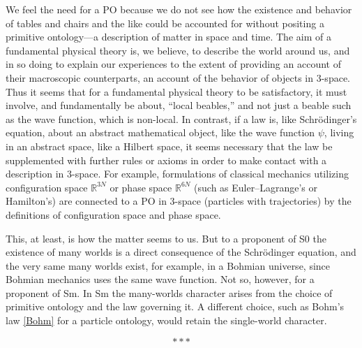 \documentclass[12pt]{article}
\newcommand{\RRR}{\mathbb{R}}
\newcommand{\z}[1]{{#1}}
\begin{document}
\z{We feel the need for a PO because}
we do not see how the existence and behavior of
tables and chairs and the like could be accounted for without positing a
primitive ontology---a description of matter in space and time.
The aim of a fundamental physical theory is, we believe, to describe the
world around us, and in so doing to explain our experiences to the extent
of providing an account of their macroscopic counterparts, an account of
the behavior of objects in $3$-space. Thus it seems that for a fundamental
physical theory to be satisfactory, it must involve, and fundamentally be
about, ``local beables,'' and not just a beable such as the wave function,
which is non-local.
In contrast, if a law is, like Schr\"odinger's equation,
about an abstract mathematical object, like the wave function $\psi$, living in an abstract space,
like a Hilbert space, it seems necessary that the law be supplemented with further rules or axioms in
order to make contact with a description in 3-space. For example,
formulations of classical mechanics utilizing configuration space
$\RRR^{3N}$ or phase space $\RRR^{6N}$ (such as Euler--Lagrange's or
Hamilton's) are connected to a PO in 3-space (particles with trajectories)
by the definitions of configuration space and phase space.

\z{This, at least, is how the matter seems  to us. But to}
 a proponent of S0 \z{the} existence of many worlds is a direct consequence of the Schr\"odinger equation, and \z{the} very same many worlds exist, for example, in a Bohmian universe, since Bohmian mechanics uses the same wave function. Not so, however, for a proponent of Sm. In Sm the many-worlds character arises from 
 \z{the} choice of primitive ontology and the law governing it.  A different choice, such as Bohm's law \eqref{Bohm} for a particle ontology, would  retain the single-world character.

\[***\]
\end{document}
